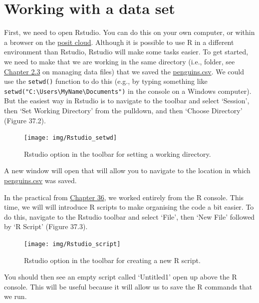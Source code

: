 \documentclass[
]{scrbook}
\begin{document}
\hypertarget{working-with-a-data-set}{%
\section{Working with a data set}\label{working-with-a-data-set}}

First, we need to open Rstudio.
You can do this on your own computer, or within a browser on the \href{https://posit.cloud/}{posit cloud}.
Although it is possible to use R in a different environment than Rstudio, Rstudio will make some tasks easier.
To get started, we need to make that we are working in the same directory (i.e., folder, see \protect\hyperlink{managing-data-files}{Chapter 2.3} on managing data files) that we saved the \href{https://raw.githubusercontent.com/bradduthie/SCIU4T4/main/data/penguins.csv}{penguins.csv}.
We could use the \texttt{setwd()} function to do this (e.g., by typing something like \texttt{setwd("C:\textbackslash{}Users\textbackslash{}MyName\textbackslash{}Documents")} in the console on a Windows computer).
But the easiest way in Rstudio is to navigate to the toolbar and select `Session', then `Set Working Directory' from the pulldown, and then `Choose Directory' (Figure 37.2).

\begin{figure}
\texttt{[image: img/Rstudio\_setwd]} \caption{Rstudio option in the toolbar for setting a working directory.}\label{fig:unnamed-chunk-219}
\end{figure}

A new window will open that will allow you to navigate to the location in which \href{https://raw.githubusercontent.com/bradduthie/SCIU4T4/main/data/penguins.csv}{penguins.csv} was saved.

In the practical from \protect\hyperlink{Chapter_36}{Chapter 36}, we worked entirely from the R console.
This time, we will will introduce R scripts to make organising the code a bit easier.
To do this, navigate to the Rstudio toolbar and select `File', then `New File' followed by `R Script' (Figure 37.3).

\begin{figure}
\texttt{[image: img/Rstudio\_script]} \caption{Rstudio option in the toolbar for creating a new R script.}\label{fig:unnamed-chunk-220}
\end{figure}

You should then see an empty script called `Untitled1' open up above the R console.
This will be useful because it will allow us to save the R commands that we run.
\end{document}
